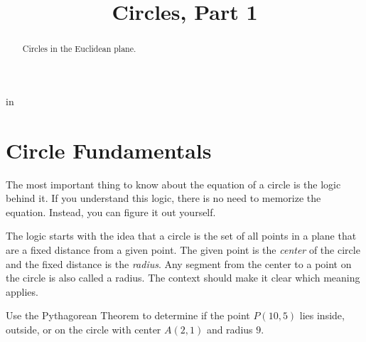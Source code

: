 \documentclass{ximera}
\title{Circles, Part 1}
\newcommand{\pskip}{\vskip 0.1 in}
\begin{document}
\begin{abstract}
Circles in the Euclidean plane.
\end{abstract}
\maketitle


\pskip




\section*{Circle Fundamentals}

The most important thing to know about the equation of a circle is the logic behind it. If you understand this logic, there is no need to memorize the equation. Instead, you can figure it out yourself.

The logic starts with the idea that a circle is the set of all points in a plane that are a fixed distance from a given point. The given point is the \emph{center} of the circle and the fixed distance is the \emph{radius}. Any segment from the center to a point on the circle is also called a radius. The context should make it clear which meaning applies.




\begin{example} \label{Ex1}
Use the Pythagorean Theorem to determine if the point $P(10,5)$ lies inside, outside, or on the circle with center $A(2,1)$ and radius $9$. 
\end{example}
\end{document}
